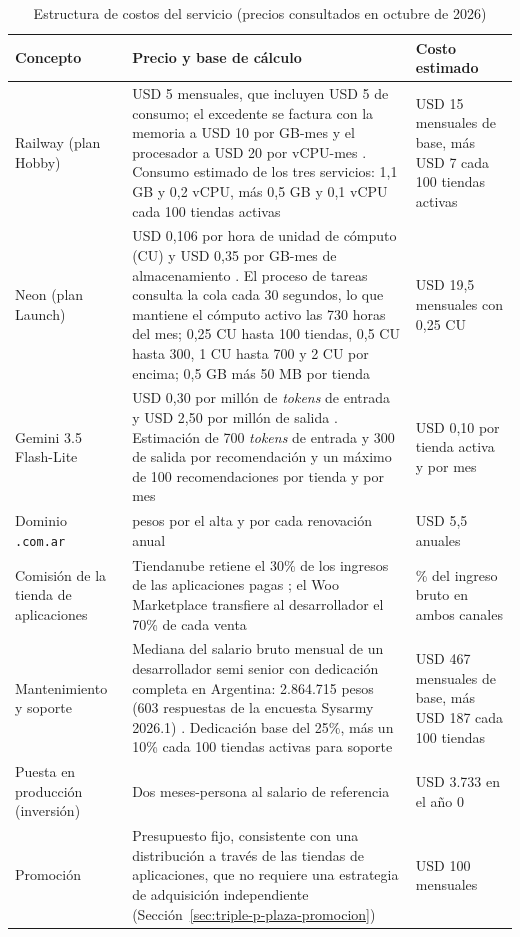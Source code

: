 \begin{table}[!htbp]
\centering
\caption{Estructura de costos del servicio (precios consultados en octubre de 2026)}
\label{tab:viabilidad-costos}
\renewcommand{\arraystretch}{1.3}
\footnotesize
\setlength{\tabcolsep}{4pt}
\begin{tabular}{|>{\raggedright\arraybackslash}m{2.6cm}|>{\raggedright\arraybackslash}m{6.4cm}|>{\raggedright\arraybackslash}m{3.6cm}|}
\hline
\textbf{Concepto} & \textbf{Precio y base de cálculo} & \textbf{Costo estimado} \\
\hline
Railway (plan Hobby) & USD 5 mensuales, que incluyen USD 5 de consumo; el excedente se factura con la memoria a USD 10 por GB-mes y el procesador a USD 20 por vCPU-mes \parencite{RailwayPricing2026}. Consumo estimado de los tres servicios: 1,1 GB y 0,2 vCPU, más 0,5 GB y 0,1 vCPU cada 100 tiendas activas & USD 15 mensuales de base, más USD 7 cada 100 tiendas activas \\
\hline
Neon (plan Launch) & USD 0,106 por hora de unidad de cómputo (CU) y USD 0,35 por GB-mes de almacenamiento \parencite{NeonPricing2026}. El proceso de tareas consulta la cola cada 30 segundos, lo que mantiene el cómputo activo las 730 horas del mes; 0,25 CU hasta 100 tiendas, 0,5 CU hasta 300, 1 CU hasta 700 y 2 CU por encima; 0,5 GB más 50 MB por tienda & USD 19,5 mensuales con 0,25 CU \\
\hline
Gemini 3.5 Flash-Lite & USD 0,30 por millón de \emph{tokens} de entrada y USD 2,50 por millón de salida \parencite{GoogleGeminiPricing2026}. Estimación de 700 \emph{tokens} de entrada y 300 de salida por recomendación y un máximo de 100 recomendaciones por tienda y por mes & USD 0,10 por tienda activa y por mes \\
\hline
Dominio \texttt{.com.ar} & 8.500 pesos por el alta y por cada renovación anual \parencite{NICArgentina2026} & USD 5,5 anuales \\
\hline
Comisión de la tienda de aplicaciones & Tiendanube retiene el 30\% de los ingresos de las aplicaciones pagas \parencite{TiendanubeReglamento2026}; el Woo Marketplace transfiere al desarrollador el 70\% de cada venta \parencite{WooMarketplace2026} & 30\% del ingreso bruto en ambos canales \\
\hline
Mantenimiento y soporte & Mediana del salario bruto mensual de un desarrollador semi senior con dedicación completa en Argentina: 2.864.715 pesos (603 respuestas de la encuesta Sysarmy 2026.1) \parencite{Sysarmy2026}. Dedicación base del 25\%, más un 10\% cada 100 tiendas activas para soporte & USD 467 mensuales de base, más USD 187 cada 100 tiendas \\
\hline
Puesta en producción (inversión) & Dos meses-persona al salario de referencia & USD 3.733 en el año 0 \\
\hline
Promoción & Presupuesto fijo, consistente con una distribución a través de las tiendas de aplicaciones, que no requiere una estrategia de adquisición independiente (Sección~\ref{sec:triple-p-plaza-promocion}) & USD 100 mensuales \\
\hline
\end{tabular}


\end{table}
